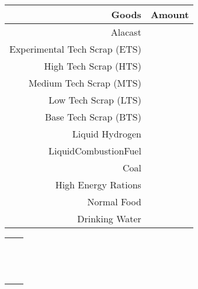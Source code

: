 \documentclass{article}
\begin{document}
\hspace{1cm}\begin{tabularx}{7.315cm}{|r|c|}
\hline
\large Goods&\large Amount \\
\hline
Alacast &\\
\hline
Experimental Tech Scrap (ETS) &\\
\hline
High Tech Scrap (HTS) &\\
\hline
Medium Tech Scrap (MTS) &\\
\hline
Low Tech Scrap (LTS) &\\
\hline
Base Tech Scrap (BTS) &\\
\hline
Liquid Hydrogen &\\
\hline
LiquidCombustionFuel &\\
\hline
Coal &\\
\hline
High Energy Rations &\\
\hline
Normal Food  &\\
\hline
Drinking Water &\\
\hline
\end{tabularx}
\begin{tabularx}{12cm}{rc}
\\\\\hline&\\\hline&\\\hline&\\\hline&\\\hline&\\\hline&\\\hline&\\\hline&\\\hline&\\\hline&\\\hline&\\\hline&\\\hline&\\
\end{tabularx}
\end{document}
